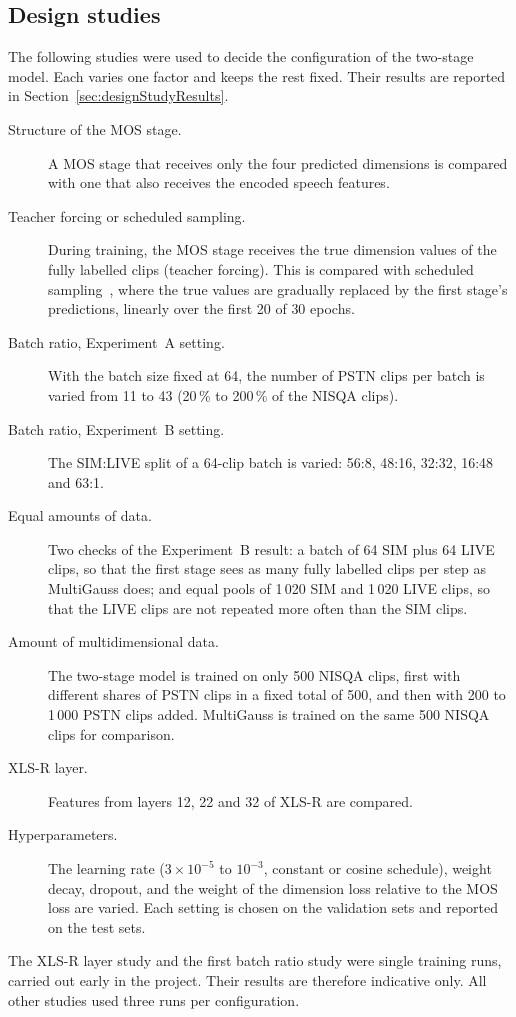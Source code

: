 \documentclass[
english,                 %
bibtex,                  %
includeExtraAbstracts, %
]{kththesis}
\numberwithin{listing}{chapter}
\begin{document}
\subsection{Design studies}
\label{sec:designStudies}

The following studies were used to decide the configuration of the two-stage model. Each varies one factor and keeps the rest fixed. Their results are reported in Section~\ref{sec:designStudyResults}.
\begin{description}
\item[Structure of the MOS stage.] A MOS stage that receives only the four predicted dimensions is compared with one that also receives the encoded speech features.
\item[Teacher forcing or scheduled sampling.] During training, the MOS stage receives the true dimension values of the fully labelled clips (teacher forcing). This is compared with scheduled sampling~\cite{bengio_scheduled_2015}, where the true values are gradually replaced by the first stage's predictions, linearly over the first 20 of 30 epochs.
\item[Batch ratio, Experiment~A setting.] With the batch size fixed at 64, the number of PSTN clips per batch is varied from 11 to 43 (20\,\% to 200\,\% of the NISQA clips).
\item[Batch ratio, Experiment~B setting.] The SIM:LIVE split of a 64-clip batch is varied: 56:8, 48:16, 32:32, 16:48 and 63:1.
\item[Equal amounts of data.] Two checks of the Experiment~B result: a batch of 64 SIM plus 64 LIVE clips, so that the first stage sees as many fully labelled clips per step as MultiGauss does; and equal pools of 1\,020 SIM and 1\,020 LIVE clips, so that the LIVE clips are not repeated more often than the SIM clips.
\item[Amount of multidimensional data.] The two-stage model is trained on only 500 NISQA clips, first with different shares of PSTN clips in a fixed total of 500, and then with 200 to 1\,000 PSTN clips added. MultiGauss is trained on the same 500 NISQA clips for comparison.
\item[XLS-R layer.] Features from layers 12, 22 and 32 of XLS-R are compared.
\item[Hyperparameters.] The learning rate ($3\times10^{-5}$ to $10^{-3}$, constant or cosine schedule), weight decay, dropout, and the weight of the dimension loss relative to the MOS loss are varied. Each setting is chosen on the validation sets and reported on the test sets.
\end{description}
The XLS-R layer study and the first batch ratio study were single training runs, carried out early in the project. Their results are therefore indicative only. All other studies used three runs per configuration.
\end{document}
